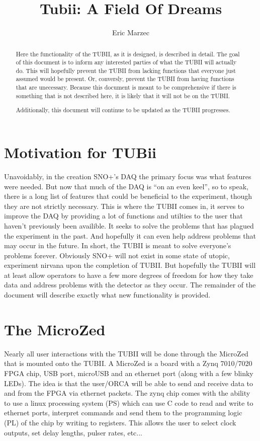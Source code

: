 \documentclass[11pt,a4paper]{article}
\author{Eric Marzec}
\title{Tubii: A Field Of Dreams}
\begin{document}
\maketitle
\begin{abstract}
Here the functionality of the TUBII, as it is designed, is described in detail. The goal of this document is to inform any interested parties of what the TUBII will actually do. This will hopefully prevent the TUBII from lacking functions that everyone just assumed would be present. Or, conversly, prevent the TUBII from having functions that are unecessary. Because this document is meant to be comprehensive if there is something that is not described here, it is likely that it will not be on the TUBII. 

Additionally, this document will continue to be updated as the TUBII progresses.
\end{abstract}
\section{Motivation for TUBii}
Unavoidably, in the creation SNO+'s DAQ the primary focus was what features were needed. But now that much of the DAQ is ``on an even keel'', so to speak, there is a long list of features that could be beneficial to the experiment, though they are not strictly necessary. This is where the TUBII comes in, it serves to improve the DAQ by providing a lot of functions and utilties to the user that haven't previously been availible. It seeks to solve the problems that has plagued the experiment in the past. And hopefully it can even help address problems that may occur in the future. In short, the TUBII is meant to solve everyone's problems forever. Obviously SNO+ will not exist in some state of utopic, experiment nirvana upon the completion of TUBII. But hopefully the TUBII will at least allow operators to have a few more degrees of freedom for how they take data and address problems with the detector as they occur. The remainder of the document will describe exactly what new functionality is provided.

\section{The MicroZed}

Nearly all user interactions with the TUBII will be done through the MicroZed that is mounted onto the TUBII. A MicroZed is a board with a Zynq 7010/7020 FPGA chip, USB port, microUSB and an ethernet port (along with a few blinky LEDs). The idea is that the user/ORCA will be able to send and receive data to and from the FPGA via ethernet packets. The zynq chip comes with the ability to use a linux processing system (PS) which can use C code to read and write to ethernet ports, interpret commands and send them to the programming logic (PL) of the chip by writing to registers. This allows the user to select clock outputs, set delay lengths, pulser rates, etc...
\end{document}
